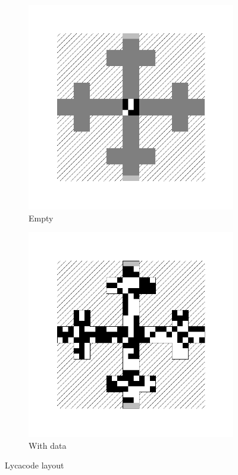 \begin{figure}[H]
  \centering
  \begin{subfigure}{0.4\textwidth}
    \centering
    \includegraphics[width=\textwidth]{images/lycacode_layout}
    \caption{Empty}
    \label{fig:lycacode_layout}
  \end{subfigure}
  \begin{subfigure}{0.4\textwidth}
    \centering
    \includegraphics[width=\textwidth]{images/lycacode_data_layout}
    \caption{With data}
    \label{fig:lycacode_ex_data_layout}
  \end{subfigure}
  \caption{Lycacode layout}
\end{figure}

